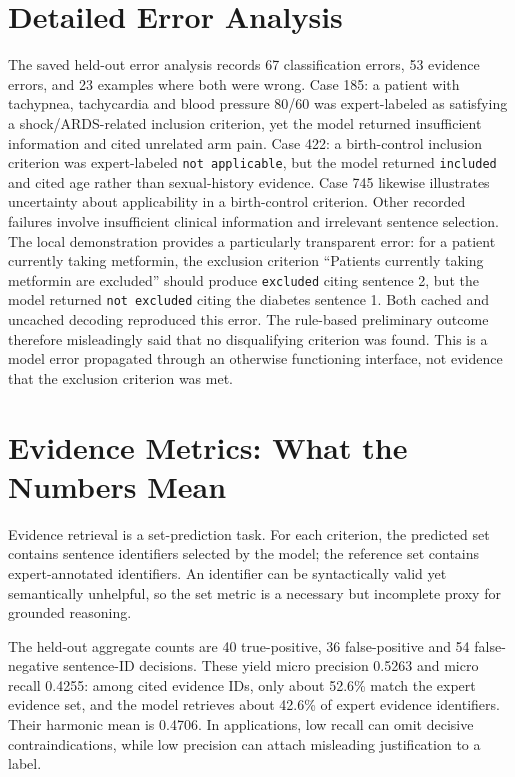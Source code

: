 \documentclass[conference]{IEEEtran}
\begin{document}
\section{Detailed Error Analysis}
The saved held-out error analysis records 67 classification errors, 53 evidence errors, and 23 examples where both were wrong. Case 185: a patient with tachypnea, tachycardia and blood pressure 80/60 was expert-labeled as satisfying a shock/ARDS-related inclusion criterion, yet the model returned insufficient information and cited unrelated arm pain. Case 422: a birth-control inclusion criterion was expert-labeled \texttt{not applicable}, but the model returned \texttt{included} and cited age rather than sexual-history evidence. Case 745 likewise illustrates uncertainty about applicability in a birth-control criterion. Other recorded failures involve insufficient clinical information and irrelevant sentence selection. The local demonstration provides a particularly transparent error: for a patient currently taking metformin, the exclusion criterion ``Patients currently taking metformin are excluded'' should produce \texttt{excluded} citing sentence 2, but the model returned \texttt{not excluded} citing the diabetes sentence 1. Both cached and uncached decoding reproduced this error. The rule-based preliminary outcome therefore misleadingly said that no disqualifying criterion was found. This is a model error propagated through an otherwise functioning interface, not evidence that the exclusion criterion was met.


\section{Evidence Metrics: What the Numbers Mean}
Evidence retrieval is a set-prediction task. For each criterion, the predicted set contains sentence identifiers selected by the model; the reference set contains expert-annotated identifiers. An identifier can be syntactically valid yet semantically unhelpful, so the set metric is a necessary but incomplete proxy for grounded reasoning.

The held-out aggregate counts are 40 true-positive, 36 false-positive and 54 false-negative sentence-ID decisions. These yield micro precision 0.5263 and micro recall 0.4255: among cited evidence IDs, only about 52.6\% match the expert evidence set, and the model retrieves about 42.6\% of expert evidence identifiers. Their harmonic mean is 0.4706. In applications, low recall can omit decisive contraindications, while low precision can attach misleading justification to a label.
\end{document}
